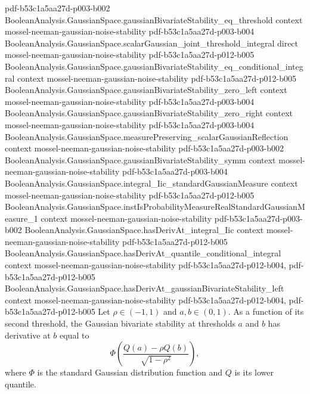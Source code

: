 \begin{lemma}
  {pdf-b53c1a5aa27d-p003-b002}
\proofstep
  {BooleanAnalysis.GaussianSpace.gaussianBivariateStability_eq_threshold}
  {context}
  {mossel-neeman-gaussian-noise-stability}
  {pdf-b53c1a5aa27d-p003-b004}
\proofstep
  {BooleanAnalysis.GaussianSpace.scalarGaussian_joint_threshold_integral}
  {direct}
  {mossel-neeman-gaussian-noise-stability}
  {pdf-b53c1a5aa27d-p012-b005}
\proofstep
  {BooleanAnalysis.GaussianSpace.gaussianBivariateStability_eq_conditional_integral}
  {context}
  {mossel-neeman-gaussian-noise-stability}
  {pdf-b53c1a5aa27d-p012-b005}
\proofstep
  {BooleanAnalysis.GaussianSpace.gaussianBivariateStability_zero_left}
  {context}
  {mossel-neeman-gaussian-noise-stability}
  {pdf-b53c1a5aa27d-p003-b004}
\proofstep
  {BooleanAnalysis.GaussianSpace.gaussianBivariateStability_zero_right}
  {context}
  {mossel-neeman-gaussian-noise-stability}
  {pdf-b53c1a5aa27d-p003-b004}
\proofstep
  {BooleanAnalysis.GaussianSpace.measurePreserving_scalarGaussianReflection}
  {context}
  {mossel-neeman-gaussian-noise-stability}
  {pdf-b53c1a5aa27d-p003-b002}
\proofstep
  {BooleanAnalysis.GaussianSpace.gaussianBivariateStability_symm}
  {context}
  {mossel-neeman-gaussian-noise-stability}
  {pdf-b53c1a5aa27d-p003-b004}
\proofstep
  {BooleanAnalysis.GaussianSpace.integral_Iic_standardGaussianMeasure}
  {context}
  {mossel-neeman-gaussian-noise-stability}
  {pdf-b53c1a5aa27d-p012-b005}
\proofstep
  {BooleanAnalysis.GaussianSpace.instIsProbabilityMeasureRealStandardGaussianMeasure_1}
  {context}
  {mossel-neeman-gaussian-noise-stability}
  {pdf-b53c1a5aa27d-p003-b002}
\proofstep
  {BooleanAnalysis.GaussianSpace.hasDerivAt_integral_Iic}
  {context}
  {mossel-neeman-gaussian-noise-stability}
  {pdf-b53c1a5aa27d-p012-b005}
\proofstep
  {BooleanAnalysis.GaussianSpace.hasDerivAt_quantile_conditional_integral}
  {context}
  {mossel-neeman-gaussian-noise-stability}
  {pdf-b53c1a5aa27d-p012-b004,
    pdf-b53c1a5aa27d-p012-b005}
\proofstep
  {BooleanAnalysis.GaussianSpace.hasDerivAt_gaussianBivariateStability_left}
  {context}
  {mossel-neeman-gaussian-noise-stability}
  {pdf-b53c1a5aa27d-p012-b004,
    pdf-b53c1a5aa27d-p012-b005}
Let $\rho\in(-1,1)$ and $a,b\in(0,1)$. As a function of its second threshold, the
Gaussian bivariate stability at thresholds $a$ and $b$ has derivative at $b$ equal to
\[
\Phi\!\left(\frac{Q(a)-\rho Q(b)}{\sqrt{1-\rho^2}}\right),
\]
where $\Phi$ is the standard Gaussian distribution function and $Q$ is its lower
quantile.
\end{lemma}

